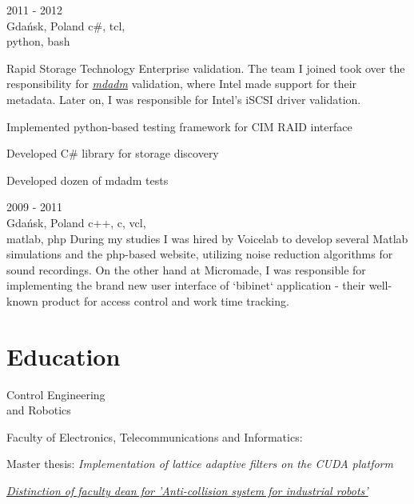 \documentclass[a4paper,11pt]{cv4tw}%
\begin{document}
      {2011 - 2012\\Gdańsk, Poland}
      {c\#, tcl,\\python, bash}
      {Rapid Storage Technology Enterprise validation. The team I joined took over the responsibility
        for \href{https://en.wikipedia.org/wiki/Mdadm}{\emph{mdadm}} validation, where Intel
        made support for their metadata. Later on, I was responsible for Intel's iSCSI driver validation.
        \begin{missions}
        \item Implemented python-based testing framework for CIM RAID interface
        \item Developed C\# library for storage discovery
        \item Developed dozen of mdadm tests
        \end{missions}
      }
      {2009 - 2011\\Gdańsk, Poland}
      {c++, c, vcl,\\matlab, php}
      {During my studies I was hired by Voicelab to develop several Matlab simulations and the php-based
        website, utilizing noise reduction algorithms for sound recordings. On the other hand at Micromade,
        I was responsible for implementing the brand new user interface of `bibinet` application - their well-known
        product for access control and work time tracking.
      }
\section{Education}
      {Control Engineering\\and Robotics}
      {Faculty of Electronics, Telecommunications and Informatics:
        \begin{missions}
          \item Master thesis: \textit{Implementation of lattice adaptive filters on the CUDA platform}
          \item \href{https://projektgrupowy.eti.pg.gda.pl/editions/2/projects/496/posters/138}{\emph{Distinction of faculty dean for \itshape 'Anti-collision system for industrial robots'}}
        \end{missions}
      }
\end{document}
